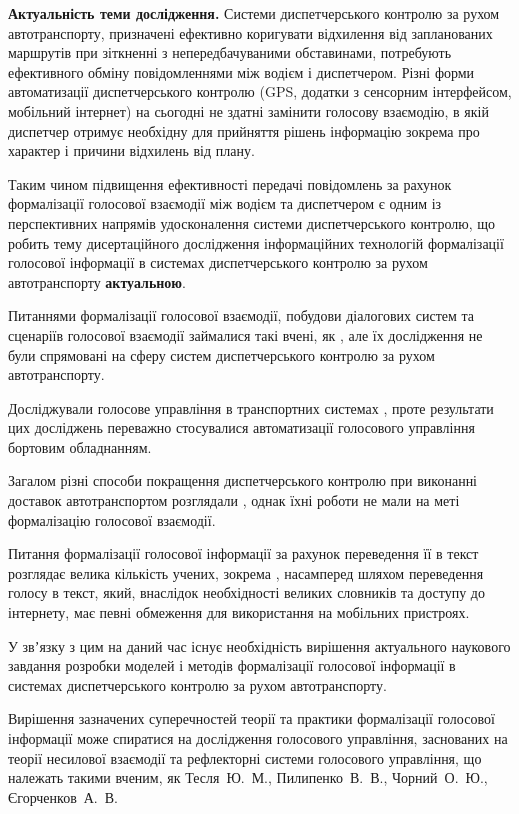 \textbf{Актуальність теми дослідження.} 
Системи диспетчерського контролю за рухом автотранспорту, призначені ефективно коригувати відхилення від запланованих маршрутів при зіткненні з непередбачуваними обставинами, потребують ефективного обміну повідомленнями між водієм і диспетчером. Різні форми автоматизації диспетчерського контролю (GPS, додатки з сенсорним інтерфейсом, мобільний інтернет) на сьогодні не здатні замінити голосову взаємодію, в якій диспетчер отримує необхідну для прийняття рішень інформацію зокрема про характер і причини відхилень від плану. 

Таким чином підвищення ефективності передачі повідомлень за рахунок формалізації голосової взаємодії між водієм та диспетчером є одним із перспективних напрямів удосконалення системи диспетчерського контролю, що робить тему дисертаційного дослідження інформаційних технологій формалізації голосової інформації в системах диспетчерського контролю за рухом автотранспорту \textbf{актуальною}.

\begin{refsection}
Питаннями формалізації голосової взаємодії, побудови діалогових систем та сценаріїв голосової взаємодії займалися такі вчені, як , але їх дослідження не були спрямовані на сферу систем диспетчерського контролю за рухом автотранспорту. 

Досліджували голосове управління в транспортних системах , проте результати цих досліджень переважно стосувалися автоматизації голосового управління бортовим обладнанням.

Загалом різні способи покращення диспетчерського контролю при виконанні доставок автотранспортом розглядали , однак їхні роботи не мали на меті формалізацію голосової взаємодії.

Питання формалізації голосової інформації за рахунок переведення її в текст розглядає велика кількість учених, зокрема , насамперед шляхом переведення голосу в текст, який, внаслідок необхідності великих словників та доступу до інтернету, має певні обмеження для використання на мобільних пристроях.

У звʼязку з цим на даний час існує необхідність вирішення актуального наукового завдання розробки моделей і методів формалізації голосової інформації в системах диспетчерського контролю за рухом автотранспорту.

Вирішення зазначених суперечностей теорії та практики формалізації голосової інформації може спиратися на дослідження голосового управління, заснованих на теорії несилової взаємодії та рефлекторні системи голосового управління, що належать такими вченим, як Тесля~Ю.~М., Пилипенко~В.~В., Чорний~О.~Ю., Єгорченков~А.~В.
\end{refsection}

